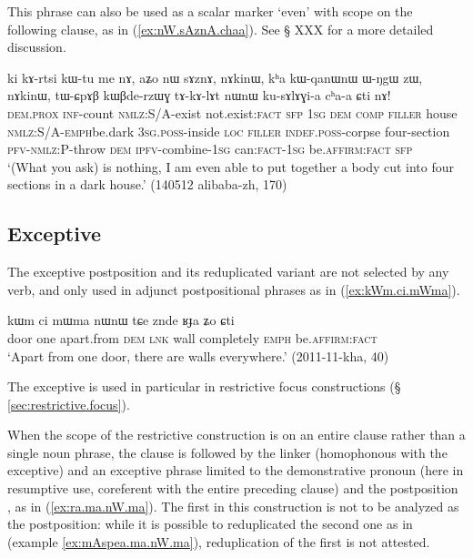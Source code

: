 This phrase can also be used as a scalar marker `even' with scope on the following clause, as in (\ref{ex:nW.sAznA.chaa}). See § XXX for a more detailed discussion. %
 

 \begin{exe}
 \ex \label{ex:nW.sAznA.chaa}
 \gll ki kɤ-rtsi kɯ-tu me nɤ, aʑo nɯ sɤznɤ, nɤkinɯ, kʰa kɯ-qanɯ\redp{}nɯ ɯ-ŋgɯ zɯ, nɤkinɯ, tɯ-ɕpɤβ kɯβde-rzɯɣ tɤ-kɤ-lɤt nɯnɯ ku-sɤlɤɣi-a cʰa-a ɕti nɤ! \\
 \textsc{dem}.\textsc{prox} \textsc{inf}-count \textsc{nmlz}:S/A-exist not.exist:\textsc{fact} \textsc{sfp} \textsc{1sg} \textsc{dem} \textsc{comp} \textsc{filler} house   \textsc{nmlz}:S/A-\textsc{emph}\redp{}be.dark \textsc{3sg}.\textsc{poss}-inside \textsc{loc}  \textsc{filler} \textsc{indef}.\textsc{poss}-corpse four-section \textsc{pfv}-\textsc{nmlz}:P-throw \textsc{dem} \textsc{ipfv}-combine-\textsc{1sg} can:\textsc{fact}-\textsc{1sg} be.\textsc{affirm}:\textsc{fact} \textsc{sfp}  \\
\glt  `(What you ask) is nothing, I am even able to put together a body cut into four sections in a dark house.' (140512 alibaba-zh, 170)
\end{exe}

\subsection{Exceptive} \label{sec:exceptive} %
The exceptive postposition  and its reduplicated variant  are not selected by any verb, and only used in adjunct postpositional phrases as in (\ref{ex:kWm.ci.mWma}).

 \begin{exe}
 \ex \label{ex:kWm.ci.mWma}
 \gll kɯm ci mɯma nɯnɯ tɕe znde ʁɟa ʑo ɕti \\
 door one apart.from \textsc{dem} \textsc{lnk} wall completely \textsc{emph} be.\textsc{affirm}:\textsc{fact} \\
 \glt `Apart from one door, there are walls everywhere.' (2011-11-kha, 40)
\end{exe}

The exceptive  is used in particular in restrictive focus constructions (§ \ref{sec:restrictive.focus}).

When the scope of the restrictive construction is on an entire clause rather than a single noun phrase, the clause is followed by the linker  (homophonous with the exceptive) and an exceptive phrase limited to the demonstrative pronoun  (here in resumptive use, coreferent with the entire preceding clause) and the postposition , as in (\ref{ex:ra.ma.nW.ma}). The first  in this construction is not to be analyzed as the postposition: while it is possible to reduplicated the second one as in  (example \ref{ex:mAspea.ma.nW.ma}), reduplication of the first  is not attested.

